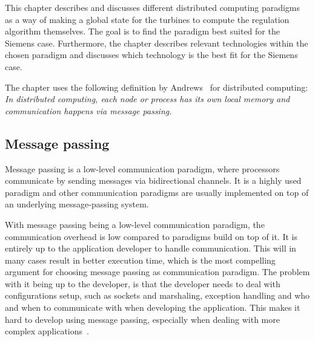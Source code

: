 
This chapter describes and discusses different distributed computing paradigms as a way of making a global state for the turbines to compute the regulation algorithm themselves. The goal is to find the paradigm best suited for the Siemens case. Furthermore, the chapter describes relevant technologies within the chosen paradigm and discusses which technology is the best fit for the Siemens case.

The chapter uses the following definition by Andrews~\cite{andrews2000foundations} for distributed computing: \textit{In distributed computing, each node or process has its own local memory and communication happens via message passing.}




%



\subsection{Message passing}

Message passing is a low-level communication paradigm, where processors communicate by sending messages via bidirectional channels. It is a highly used paradigm and other communication paradigms are usually implemented on top of an underlying message-passing system.  

With message passing being a low-level communication paradigm, the communication overhead is low compared to paradigms build on top of it. It is entirely up to the application developer to handle communication. This will in many cases result in better execution time, which is the most compelling argument for choosing message passing as communication paradigm. The problem with it being up to the developer, is that the developer needs to deal with configurations setup, such as sockets and marshaling, exception handling and who and when to communicate with when developing the application. This makes it hard to develop using message passing, especially when dealing with more complex applications~\cite{lu1995message}. 


